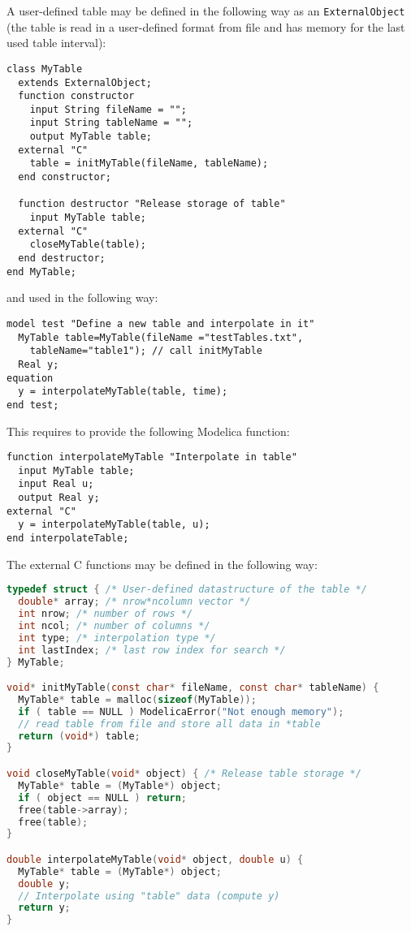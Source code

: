 \begin{example}
A user-defined table may be defined in the following way as an {\lstinline!ExternalObject!} (the table is read in a user-defined format from file and has memory for the last used table interval):
\begin{lstlisting}[language=modelica]
class MyTable
  extends ExternalObject;
  function constructor
    input String fileName = "";
    input String tableName = "";
    output MyTable table;
  external "C"
    table = initMyTable(fileName, tableName);
  end constructor;

  function destructor "Release storage of table"
    input MyTable table;
  external "C"
    closeMyTable(table);
  end destructor;
end MyTable;
\end{lstlisting}
and used in the following way:
\begin{lstlisting}[language=modelica]
model test "Define a new table and interpolate in it"
  MyTable table=MyTable(fileName ="testTables.txt",
    tableName="table1"); // call initMyTable
  Real y;
equation
  y = interpolateMyTable(table, time);
end test;
\end{lstlisting}

This requires to provide the following Modelica function:
\begin{lstlisting}[language=modelica]
function interpolateMyTable "Interpolate in table"
  input MyTable table;
  input Real u;
  output Real y;
external "C"
  y = interpolateMyTable(table, u);
end interpolateTable;
\end{lstlisting}
The external C functions may be defined in the following way:
\begin{lstlisting}[language=C]
typedef struct { /* User-defined datastructure of the table */
  double* array; /* nrow*ncolumn vector */
  int nrow; /* number of rows */
  int ncol; /* number of columns */
  int type; /* interpolation type */
  int lastIndex; /* last row index for search */
} MyTable;

void* initMyTable(const char* fileName, const char* tableName) {
  MyTable* table = malloc(sizeof(MyTable));
  if ( table == NULL ) ModelicaError("Not enough memory");
  // read table from file and store all data in *table
  return (void*) table;
}

void closeMyTable(void* object) { /* Release table storage */
  MyTable* table = (MyTable*) object;
  if ( object == NULL ) return;
  free(table->array);
  free(table);
}

double interpolateMyTable(void* object, double u) {
  MyTable* table = (MyTable*) object;
  double y;
  // Interpolate using "table" data (compute y)
  return y;
}
\end{lstlisting}
\end{example}
